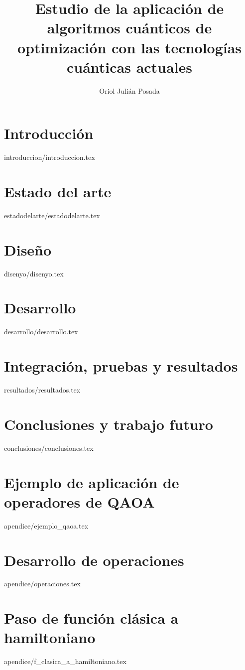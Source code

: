 \documentclass[epsbased,copyright,final,printable,covers,extendedindex,firstnumbered,tfg,gnuplot]{tfgtfmthesisuam}
\title[Aplicación de algoritmos cuánticos de optimización con las tecnologías cuánticas actuales]{Estudio de la aplicación de algoritmos cuánticos de optimización con las tecnologías cuánticas actuales}
\author{Oriol Julián Posada}
\begin{document}
\chapter{Introducción\label{cap:introduccion}}{introduccion/introduccion.tex}

\chapter{Estado del arte\label{CAP:ESTADODELARTE}}{estadodelarte/estadodelarte.tex}

\chapter{Diseño\label{CAP:DISEÑO}}{disenyo/disenyo.tex}

\chapter{Desarrollo\label{CAP:DESARROLLO}}{desarrollo/desarrollo.tex}

\chapter{Integración, pruebas y resultados\label{CAP:RESULTADOS}}{resultados/resultados.tex}

\chapter{Conclusiones y trabajo futuro\label{CAP:CONCLUSIONES}}{conclusiones/conclusiones.tex}



\newpage
{}




\appendix

\chapter{Ejemplo de aplicación de operadores de QAOA\label{CAP:EJEMPLO_QAOA}}{apendice/ejemplo_qaoa.tex}
\chapter{Desarrollo de operaciones}{apendice/operaciones.tex}
\chapter{Paso de función clásica a hamiltoniano\label{CAP:F_CLASICA_A_HAMILTONIANO}}{apendice/f_clasica_a_hamiltoniano.tex}
\end{document}
